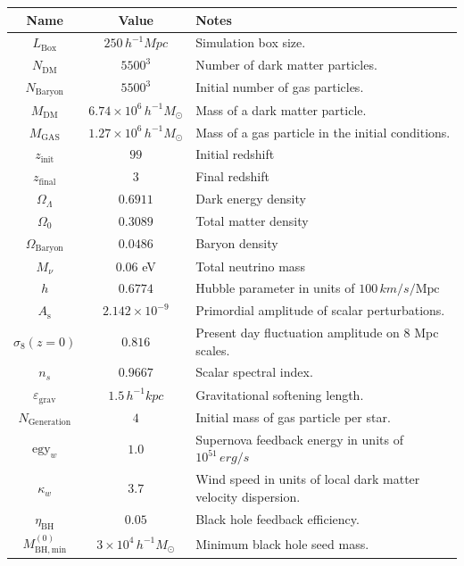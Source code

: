 \documentclass[fleqn,usenatbib]{mnras}
\newcommand{\kpch}{\,h^{-1}\unit{kpc}}
\newcommand{\mpch}{\,h^{-1}\unit{Mpc}}
\newcommand{\msunh}{\,h^{-1}\unit{M_\odot}}
\begin{document}
\begin{table}
  \begin{tabular}{ccl}
  \hline
    Name & Value & Notes \\
    \hline
    $L_\mathrm{Box} $ &     $250\mpch$ & Simulation box size. \\
    $N_\mathrm{DM}$ &     $5500^3$  &   Number of dark matter particles. \\
    $N_\mathrm{Baryon}$ &     $5500^3$  &   Initial number of gas particles. \\
    $M_\mathrm{DM}$  &     $6.74\times10^6 \msunh$  &   Mass of a dark matter particle. \\
    $M_\mathrm{GAS}$  &    $1.27\times10^6 \msunh$ &     Mass of a gas particle in the initial conditions. \\
    $z_\mathrm{init}$ & $99$ & Initial redshift \\
    $z_\mathrm{final}$ & $3$ & Final redshift \\
    $\Omega_\Lambda$  & $0.6911$  & Dark energy density \\
    $\Omega_\mathrm{0}$ & $0.3089$ &   Total matter density\\
    $\Omega_\mathrm{Baryon}$ &    $0.0486$  & Baryon density\\
    $M_\nu$ & $0.06$ eV & Total neutrino mass \\
    $h$  &  $0.6774$ & Hubble parameter in units of $100\,\unit{km/s/\mathrm{Mpc}}$ \\
    $A_\mathrm{s}$  &      $2.142\times 10^{-9}$ & Primordial amplitude of scalar perturbations.\\
    $\sigma_8(z=0)$ &  $0.816$ & Present day fluctuation amplitude on $8$ Mpc scales. \\
    $n_s$  &     $0.9667$ & Scalar spectral index. \\
    $\varepsilon_\mathrm{grav}$ &    $1.5\kpch$ &     Gravitational softening length. \\
    $N_\mathrm{Generation}$ &     $4$ & Initial mass of gas particle per star. \\
    $\mathrm{egy}_w$ &      $1.0$  &  Supernova feedback energy in units of $10^{51}\,\unit{erg/s}$\\
    $\kappa_w$  &     $3.7$ &    Wind speed in units of local dark matter velocity dispersion. \\
    $\eta_\mathrm{BH}$ &    $0.05$ &    Black hole feedback efficiency. \\
    $M^{(0)}_\mathrm{BH,min}$ &    $3\times 10^{4}\msunh$ &   Minimum black hole seed mass.\\

\end{tabular}
\end{table}
\end{document}
